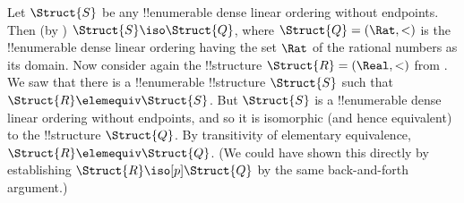 \documentclass[../../include/open-logic-section]{subfiles}
\begin{document}
\begin{rem}
  Let $\Struct{S}$ be any !!{enumerable} dense linear ordering without
  endpoints. Then (by ) $\Struct{S} \iso
  \Struct{Q}$, where $\Struct{Q} = (\Rat, <)$ is the !!{enumerable}
  dense linear ordering having the set $\Rat$ of the rational numbers
  as its domain. Now consider again the !!{structure} $\Struct{R} =
  (\Real, <)$ from . We saw that there is a
  !!{enumerable} !!{structure} $\Struct{S}$ such that $\Struct{R}
  \elemequiv \Struct{S}$. But $\Struct{S}$ is a !!{enumerable} dense
  linear ordering without endpoints, and so it is isomorphic (and
  hence equivalent) to the !!{structure} $\Struct{Q}$. By transitivity
  of elementary equivalence, $\Struct{R} \elemequiv \Struct{Q}$. (We could
  have shown this directly by establishing $\Struct{R} \iso[p]
  \Struct{Q}$ by the same back-and-forth argument.)
\end{rem}
\end{document}
